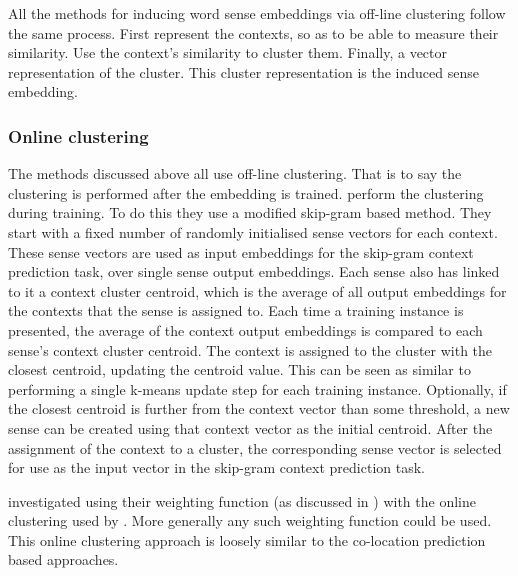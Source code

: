 \documentclass[12pt,parskip]{komatufte}
\begin{document}
All the methods for inducing word sense embeddings via off-line clustering follow the same process.
First represent the contexts,
so as to be able to measure their similarity.
Use the context's similarity to cluster them.
Finally, a vector representation of the cluster.
This cluster representation is the induced sense embedding.

\subsubsection{Online clustering}
The methods discussed above all use off-line clustering.
That is to say the clustering is performed after the embedding is trained.
 perform the clustering during training.
To do this they use a modified skip-gram based method.
They start with a fixed number of randomly initialised sense vectors for each context.
These sense vectors are used as input embeddings for the skip-gram context prediction task, over single sense output embeddings.
Each sense also has linked to it a context cluster centroid, which is the average of all output embeddings for the contexts that the sense is assigned to.
Each time a training instance is presented, the average of the context output embeddings is compared to each sense's context cluster centroid.
The context is assigned to the cluster with the closest centroid, updating the centroid value.
This can be seen as similar to performing a single k-means update step for each training instance.
Optionally, if the closest centroid is further from the context vector than some threshold,  a new sense can be created using that context vector as the initial centroid.
After the assignment of the context to a cluster, the corresponding sense vector is selected for use as the input vector in the skip-gram context prediction task.

\textcite{kaageback2015neural} investigated using their weighting function (as discussed in ) with the online clustering used by \textcite{neelakantan2015efficient}.
More generally any such weighting function could be used.
This online clustering approach is loosely similar to the co-location prediction based approaches.
\end{document}
